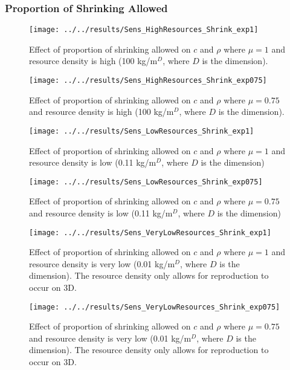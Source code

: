 \begin{refsection}
\subsubsection{Proportion of Shrinking Allowed}
\begin{figure}[H]
	\centering
	\texttt{[image: ../../results/Sens\_HighResources\_Shrink\_exp1]}
	\caption{Effect of proportion of shrinking allowed on $c$ and $\rho$ where $\mu = 1$ and resource density is high (100 kg/m$^D$, where $D$ is the dimension).}
	\label{fig:senshighresourcesshrinkexp1}
\end{figure}
\begin{figure}[h]
	\centering
	\texttt{[image: ../../results/Sens\_HighResources\_Shrink\_exp075]}
	\caption{Effect of proportion of shrinking allowed on $c$ and $\rho$ where $\mu = 0.75$ and resource density is high (100 kg/m$^D$, where $D$ is the dimension).}
	\label{fig:senshighresourcesshrinkexp075}
\end{figure}

\begin{figure}[h]
	\centering
	\texttt{[image: ../../results/Sens\_LowResources\_Shrink\_exp1]}
	\caption{Effect of proportion of shrinking allowed on $c$ and $\rho$ where $\mu = 1$ and resource density is low (0.11 kg/m$^D$, where $D$ is the dimension)}
	\label{fig:senslowresourcesshrinkexp1}
\end{figure}
\begin{figure}[h]
	\centering
	\texttt{[image: ../../results/Sens\_LowResources\_Shrink\_exp075]}
	\caption{Effect of proportion of shrinking allowed on $c$ and $\rho$ where $\mu = 0.75$ and resource density is low (0.11 kg/m$^D$, where $D$ is the dimension)}
	\label{fig:senslowresourcesshrinkexp075}
\end{figure}
\begin{figure}[h]
	\centering
	\texttt{[image: ../../results/Sens\_VeryLowResources\_Shrink\_exp1]}
	\caption{Effect of proportion of shrinking allowed on $c$ and $\rho$ where $\mu = 1$ and resource density is very low (0.01 kg/m$^D$, where $D$ is the dimension).  The resource density only allows for reproduction to occur on 3D.}
	\label{fig:sensverylowresourcesshrinkexp1}
\end{figure}
\begin{figure}[h]
	\centering
	\texttt{[image: ../../results/Sens\_VeryLowResources\_Shrink\_exp075]}
	\caption{Effect of proportion of shrinking allowed on $c$ and $\rho$ where $\mu = 0.75$ and resource density is very low (0.01 kg/m$^D$, where $D$ is the dimension).  The resource density only allows for reproduction to occur on 3D.}
	\label{fig:sensverylowresourcesshrinkexp075}
\end{figure}

\clearpage
	\printbibliography
\end{refsection}
